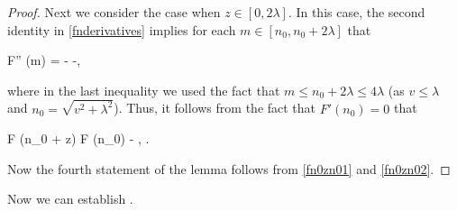 \begin{proof}
	Next we consider the case when $z \in [0, 2 \lambda]$. In this case, the second identity in \eqref{fnderivatives} implies for each $m \in [n_0, n_0 + 2 \lambda]$ that 
	\begin{flalign*}
	F'' (m) = \displaystyle{} \le -\displaystyle{} \le -\displaystyle{},
	\end{flalign*}
	
	\noindent where in the last inequality we used the fact that $m \le n_0 + 2 \lambda \le 4 \lambda$ (as $v \le \lambda$ and $n_0 = \sqrt{v^2 + \lambda^2}$). Thus, it follows from the fact that $F' (n_0) = 0$ that 
	\begin{flalign}
	\label{fn0zn02}
	F (n_0 + z) \le F (n_0) - \displaystyle{}, \quad {}.
	\end{flalign}
	
	\noindent Now the fourth statement of the lemma follows from \eqref{fn0zn01} and \eqref{fn0zn02}. 
	\end{proof}
	
	Now we can establish . 
	
